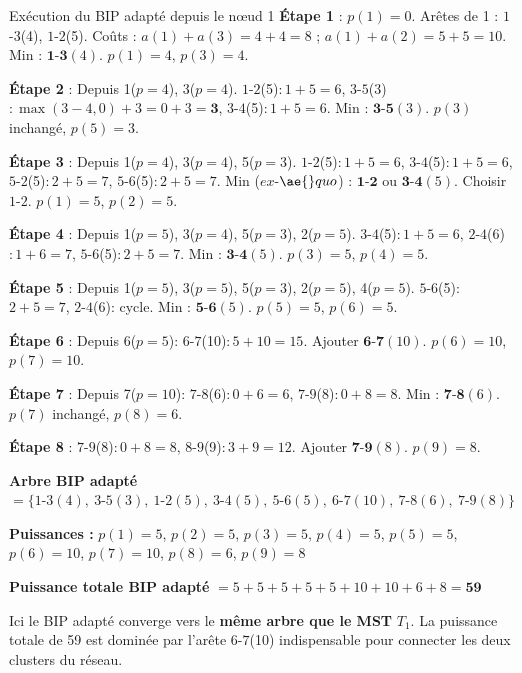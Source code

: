 \documentclass[12pt,a4paper]{article}
\begin{document}
\begin{etape}{Exécution du BIP adapté depuis le nœud 1}
\textbf{Étape 1} : $p(1)=0$. Arêtes de 1 : $1$-$3$(4), $1$-$2$(5).
Coûts : $a(1)+a(3)=4+4=8$ ; $a(1)+a(2)=5+5=10$. Min : $\mathbf{1}$-$\mathbf{3}(4)$. $p(1)=4$, $p(3)=4$.

\textbf{Étape 2} : Depuis 1($p=4$), 3($p=4$). 
$1$-$2$(5)$: 1+5=6$, $3$-$5$(3)$: \max(3-4,0)+3=0+3=\mathbf{3}$, $3$-$4$(5)$: 1+5=6$.
Min : $\mathbf{3}$-$\mathbf{5}(3)$. $p(3)$ inchangé, $p(5)=3$.

\textbf{Étape 3} : Depuis 1($p=4$), 3($p=4$), 5($p=3$).
$1$-$2$(5)$: 1+5=6$, $3$-$4$(5)$: 1+5=6$, $5$-$2$(5)$: 2+5=7$, $5$-$6$(5)$: 2+5=7$.
Min ($ex$-$\ae{}quo$) : $\mathbf{1}$-$\mathbf{2}$ ou $\mathbf{3}$-$\mathbf{4}(5)$. Choisir $1$-$2$. $p(1)=5$, $p(2)=5$.

\textbf{Étape 4} : Depuis 1($p=5$), 3($p=4$), 5($p=3$), 2($p=5$).
$3$-$4$(5)$: 1+5=6$, $2$-$4$(6)$: 1+6=7$, $5$-$6$(5)$: 2+5=7$.
Min : $\mathbf{3}$-$\mathbf{4}(5)$. $p(3)=5$, $p(4)=5$.

\textbf{Étape 5} : Depuis 1($p=5$), 3($p=5$), 5($p=3$), 2($p=5$), 4($p=5$).
$5$-$6$(5): $2+5=7$, $2$-$4$(6): cycle.
Min : $\mathbf{5}$-$\mathbf{6}(5)$. $p(5)=5$, $p(6)=5$.

\textbf{Étape 6} : Depuis 6($p=5$): $6$-$7$(10)$: 5+10=15$. Ajouter $\mathbf{6}$-$\mathbf{7}(10)$. $p(6)=10$, $p(7)=10$.

\textbf{Étape 7} : Depuis 7($p=10$): $7$-$8$(6)$: 0+6=6$, $7$-$9$(8)$: 0+8=8$.
Min : $\mathbf{7}$-$\mathbf{8}(6)$. $p(7)$ inchangé, $p(8)=6$.

\textbf{Étape 8} : $7$-$9$(8)$: 0+8=8$, $8$-$9$(9)$: 3+9=12$.
Ajouter $\mathbf{7}$-$\mathbf{9}(8)$. $p(9)=8$.
\end{etape}

\begin{resultat}
\textbf{Arbre BIP adapté} $= \{1\text{-}3(4),\ 3\text{-}5(3),\ 1\text{-}2(5),\ 3\text{-}4(5),\ 5\text{-}6(5),\ 6\text{-}7(10),\ 7\text{-}8(6),\ 7\text{-}9(8)\}$

\textbf{Puissances :} $p(1)=5$, $p(2)=5$, $p(3)=5$, $p(4)=5$, $p(5)=5$, $p(6)=10$, $p(7)=10$, $p(8)=6$, $p(9)=8$

\textbf{Puissance totale BIP adapté} $= 5+5+5+5+5+10+10+6+8 = \mathbf{59}$
\end{resultat}

\begin{remarque}
Ici le BIP adapté converge vers le \textbf{même arbre que le MST} $T_1$. La puissance totale de 59 est dominée par l'arête $6$-$7$(10) indispensable pour connecter les deux clusters du réseau.
\end{remarque}
\end{document}
